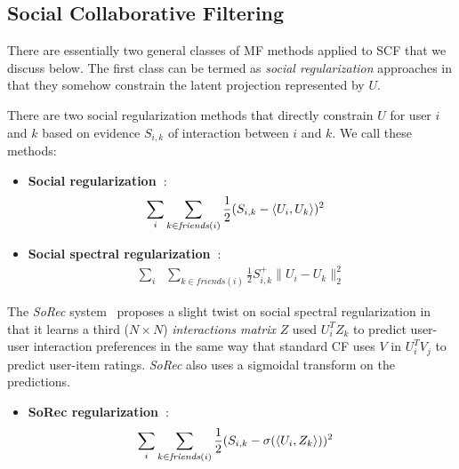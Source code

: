


\subsection{Social Collaborative Filtering}

There are essentially two general classes of MF methods applied to SCF that we discuss
below.  The first class can be termed as \emph{social regularization}
approaches in that they somehow constrain the latent projection
represented by $U$.  

There are two social regularization methods that directly constrain $U$ for user $i$
and $k$ based on evidence $S_{i,k}$ of interaction between $i$ and $k$.  We call
these methods:

\begin{itemize}
\item {\bf Social regularization~\cite{lla,socinf}}:
\begin{align}
\sum_{i} & \sum_{k \in \mathit{friends}(i)} \frac{1}{2} (S_{i,k} - \langle U_i, U_k \rangle)^2 \nonumber 
\end{align}

\item {\bf Social spectral regularization~\cite{sr,rrmf}}:
\begin{align}
\sum_{i} & \sum_{k \in \mathit{friends}(i)} \frac{1}{2} S^+_{i,k} \| U_i - U_k \|_2^2 \nonumber
\end{align}
\end{itemize}

The {\it SoRec} system~\cite{sorec} proposes a slight twist on social
spectral regularization in that it learns a third ($N \times N$)
\emph{interactions matrix} $Z$ used $U_i^T Z_k$ to predict user-user
interaction preferences in the same way that standard CF uses $V$ in
$U_i^T V_j$ to predict user-item ratings.  {\it SoRec} also uses a
sigmoidal transform on the predictions.

\begin{itemize}
\item {\bf SoRec regularization~\cite{sorec}}:
\begin{align}
\sum_{i} & \sum_{k \in \mathit{friends}(i)} \frac{1}{2} (S_{i,k} - \sigma(\langle U_i, Z_k \rangle))^2 \nonumber
\end{align}
\end{itemize}

